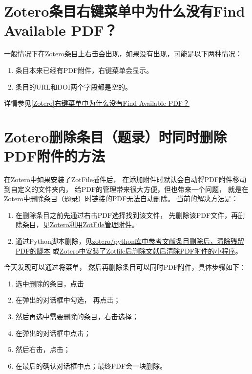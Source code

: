 \documentclass[cn,11pt,chinese]{elegantbook}
\begin{document}
	\section{Zotero条目右键菜单中为什么没有Find Available PDF？}\label{sec:Find_PDF}	
				一般情况下在Zotero条目上右击会出现，如果没有出现，可能是以下两种情况：
				\begin{enumerate}
					\item 条目本来已经有PDF附件，右键菜单会显示。
					\item 条目的URL和DOI两个字段都是空的。
				\end{enumerate}
				详情参见\href{https://zhuanlan.zhihu.com/p/348697024}
							{[Zotero]右键菜单中为什么没有Find Available PDF？}
	
	\section{Zotero删除条目（题录）时同时删除PDF附件的方法}\label{sec:Delete_attach}						
			在Zotero中如果安装了ZotFile插件后，
			在添加附件时默认会自动将PDF附件移动到自定义的文件夹内，
			给PDF的管理带来很大方便，但也带来一个问题，
			就是在Zotero中删除条目（题录）时链接的PDF无法自动删除。
			当前的解决方法是：
			\begin{enumerate}
				\item 在删除条目之前先通过右击PDF选择找到该文件，
				先删除该PDF文件，再删除条目，见\href{https://zhuanlan.zhihu.com/p/337801423}
			{Zotero利用ZotFile管理附件}。
				\item 通过Python脚本删除，见\href{https://zhuanlan.zhihu.com/p/121770068}
				{zotero/python库中参考文献条目删除后，清除残留PDF的脚本}
				或\href{https://zhuanlan.zhihu.com/p/109531298}
				{Zotero中安装了Zotfile后删除文献后清除PDF附件的小程序}。
			\end{enumerate}
			
			今天发现可以通过将菜单，
			然后再删除条目可以同时PDF附件，具体步骤如下：
			\begin{enumerate}
				\item 选中删除的条目，点击
				\item 在弹出的对话框中勾选，
					再点击；
				\item 然后再选中需要删除的条目，右击选择；
				\item 在弹出的对话框中点击；
				\item 然后右击，点击；
				\item 在最后的确认对话框中点；最终PDF会一块删除。
				\end{enumerate}
			 
\end{document}
